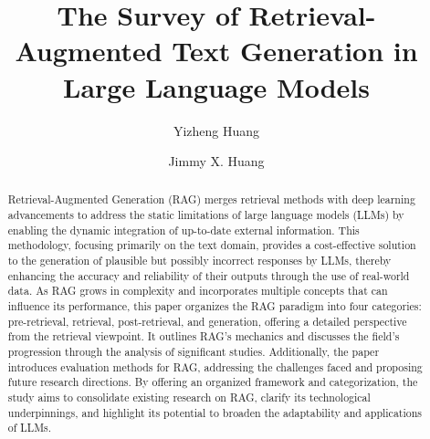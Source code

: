 \documentclass[acmsmall, table]{acmart}
\begin{document}
\title{The Survey of Retrieval-Augmented Text Generation in Large Language Models}

\author{Yizheng Huang}
\author{Jimmy X. Huang}


\renewcommand{\shortauthors}{Huang et al.}

\begin{abstract}
Retrieval-Augmented Generation (RAG) merges retrieval methods with deep learning advancements to address the static limitations of large language models (LLMs) by enabling the dynamic integration of up-to-date external information. This methodology, focusing primarily on the text domain, provides a cost-effective solution to the generation of plausible but possibly incorrect responses by LLMs, thereby enhancing the accuracy and reliability of their outputs through the use of real-world data. As RAG grows in complexity and incorporates multiple concepts that can influence its performance, this paper organizes the RAG paradigm into four categories: pre-retrieval, retrieval, post-retrieval, and generation, offering a detailed perspective from the retrieval viewpoint. It outlines RAG's mechanics and discusses the field's progression through the analysis of significant studies. Additionally, the paper introduces evaluation methods for RAG, addressing the challenges faced and proposing future research directions. By offering an organized framework and categorization, the study aims to consolidate existing research on RAG, clarify its technological underpinnings, and highlight its potential to broaden the adaptability and applications of LLMs.
\end{abstract}
\end{document}
